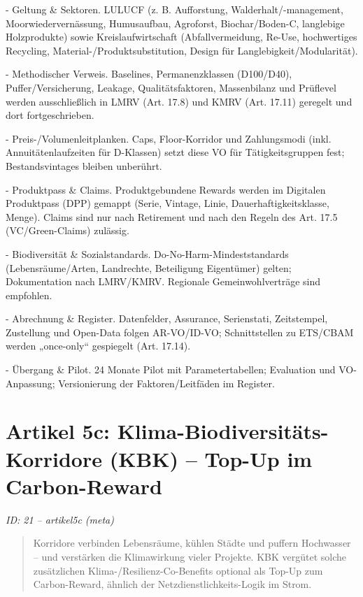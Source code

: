 \documentclass[12pt,a4paper]{scrartcl}
\begin{document}
- Geltung \& Sektoren. LULUCF (z. B. Aufforstung, Walderhalt/-management, Moorwiedervernässung, Humusaufbau, Agroforst, Biochar/Boden-C, langlebige Holzprodukte) sowie Kreislaufwirtschaft (Abfallvermeidung, Re-Use, hochwertiges Recycling, Material-/Produktsubstitution, Design für Langlebigkeit/Modularität).

- Methodischer Verweis. Baselines, Permanenzklassen (D100/D40), Puffer/Versicherung, Leakage, Qualitätsfaktoren, Massenbilanz und Prüflevel werden ausschließlich in LMRV (Art. 17.8) und KMRV (Art. 17.11) geregelt und dort fortgeschrieben.

- Preis-/Volumenleitplanken. Caps, Floor-Korridor und Zahlungsmodi (inkl. Annuitätenlaufzeiten für D-Klassen) setzt diese VO für Tätigkeitsgruppen fest; Bestandsvintages bleiben unberührt.

- Produktpass \& Claims. Produktgebundene Rewards werden im Digitalen Produktpass (DPP) gemappt (Serie, Vintage, Linie, Dauerhaftigkeitsklasse, Menge). Claims sind nur nach Retirement und nach den Regeln des Art. 17.5 (VC/Green-Claims) zulässig.

- Biodiversität \& Sozialstandards. Do-No-Harm-Mindeststandards (Lebensräume/Arten, Landrechte, Beteiligung Eigentümer) gelten; Dokumentation nach LMRV/KMRV. Regionale Gemeinwohlverträge sind empfohlen.

- Abrechnung \& Register. Datenfelder, Assurance, Serienstati, Zeitstempel, Zustellung und Open-Data folgen AR-VO/ID-VO; Schnittstellen zu ETS/CBAM werden „once-only“ gespiegelt (Art. 17.14).

- Übergang \& Pilot. 24 Monate Pilot mit Parametertabellen; Evaluation und VO-Anpassung; Versionierung der Faktoren/Leitfäden im Register.


\section[Artikel 5c: Klima-Biodiversitäts-Korridore (KBK) -- Top-Up im Carbon-Reward]{Artikel 5c: Klima-Biodiversitäts-Korridore (KBK) -- Top-Up im Carbon-Reward}
\noindent\textit{ID: 21 -- artikel5c (meta)}

\begin{quote}
Korridore verbinden Lebensräume, kühlen Städte und puffern Hochwasser -- und verstärken die Klimawirkung vieler Projekte. KBK vergütet solche zusätzlichen Klima-/Resilienz-Co-Benefits optional als Top-Up zum Carbon-Reward, ähnlich der Netzdienstlichkeits-Logik im Strom.
\end{quote}
\end{document}
